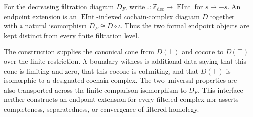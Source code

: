 \begin{definition}
  \label{def:filtered-complex-endpoint-extension}
  \leanok
  For the decreasing filtration diagram $D_F$, write
  $\iota:\mathbb Z_{\mathrm{dec}}\to\operatorname{EInt}$ for
  $s\mapsto-s$.  An endpoint extension is an
  $\operatorname{EInt}$-indexed cochain-complex diagram $D$ together with a
  natural isomorphism $D_F\cong D\circ\iota$.  Thus the two formal endpoint
  objects are kept distinct from every finite filtration level.

  The construction supplies the canonical cone from $D(\bot)$ and cocone to
  $D(\top)$ over the finite restriction.  A boundary witness is additional
  data saying that this cone is limiting and zero, that this cocone is
  colimiting, and that $D(\top)$ is isomorphic to a designated cochain
  complex.  The two universal properties are also transported across the
  finite comparison isomorphism to $D_F$.  This interface neither constructs
  an endpoint extension for every filtered complex nor asserts completeness,
  separatedness, or convergence of filtered homology.
\end{definition}

